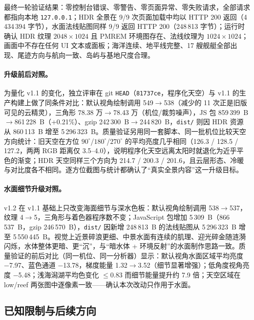 \documentclass[UTF8, a4paper, 11pt]{ctexart}
\newcommand{\file}[1]{\texttt{#1}}
\begin{document}
最终一轮验证结果：零控制台错误、零警告、零页面异常、零失败请求，全部请求都指向本地 \texttt{127.0.0.1}；HDR 全景在 9/9 次页面加载中均以 HTTP 200 返回（4\,434\,394 字节），水面法线贴图同样 9/9 返回 HTTP 200（248\,813 字节）；运行时确认 HDR 纹理 $2048\times1024$ 且 PMREM 环境图存在、法线纹理为 $1024\times1024$；画面中不存在任何 UI 文本或面板；海洋连续、地平线完整、17 艘舰艇全部出现、尾迹方向与航向一致、岛屿与基地尺度合理。

\paragraph{升级前后对照。} 为量化 v1.1 的变化，独立评审在 git \texttt{HEAD}（\texttt{81737ce}，程序化天空）与 v1.1 的生产构建上做了同条件对比：默认视角绘制调用 549$\to$538（减少的 11 次正是旧版可见的云精灵），三角形 78.38 万$\to$78.43 万（机位/裁剪噪声），JS 包 859\,399~B$\to$861\,228~B（+0.21\%）、gzip 242\,300~B$\to$244\,820~B，\file{dist/} 则因 HDR 资源从 860\,113~B 增至 5\,296\,323~B。质量验证另用同一套脚本、同一批机位比较天空方向统计：旧天空在方位 $90^\circ$/$180^\circ$/$270^\circ$ 的平均亮度几乎相同（126.3 / 128.5 / 127.2，两两 RGB 距离仅 3.5--4.0），说明程序化天空远离太阳时就退化为近乎平色的渐变；HDR 天空同样三个方向为 214.7 / 200.3 / 201.6，且云层形态、冷暖与对比度各不相同。逐方位截图与统计都确认了“真实全景内容”这一升级目标。

\paragraph{水面细节升级对照。} v1.2 在 v1.1 基础上只改变海面细节与深水色板：默认视角绘制调用 538$\to$537，纹理 4$\to$5，三角形与着色器程序数不变；JavaScript 包增加 5\,309~B（866\,537~B，gzip 246\,570~B），\file{dist/} 因新增 248\,813~B 的法线贴图从 5\,296\,323~B 增至 5\,550\,445~B。视觉上近景碎浪更细、中景水面有连续的肌理、迎光碎金随涟漪闪烁，水体整体更暗、更“沉”，与“暗水体 + 环境反射”的水面制作思路一致。质量验证的前后对比（同一机位、同一分析器）显示：默认视角水面区域平均亮度 −7.97、蓝色通道 −13.78，梯度能量 1.32$\to$3.52（细节显著增强）；低角度视角亮度 −5.48；浅海潟湖平均色变化 $\le$0.83 而细节能量提升约 7.9 倍；天空区域在 low/reef 两张图中逐像素一致——确认本次改动只作用于水面。

\subsection{已知限制与后续方向}
\end{document}
